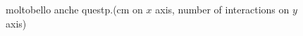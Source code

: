 \documentclass[a4paper]{article}
\begin{document}
\begin{figure}[H]
  \caption{moltobello anche questp.(cm on $x$ axis, number of interactions on $y$ axis)}
  \label{fig:2_all}
\end{figure}
\end{document}

